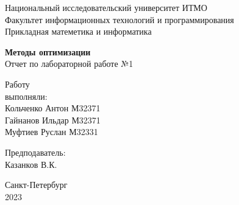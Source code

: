 \thispagestyle{empty}

\begin{center}

    Национальный исследовательский университет ИТМО\\
    Факультет информационных технологий и программирования\\
    Прикладная матеметика и информатика\\

    \vspace{20pt}

\end{center}

\vfill

\begin{center}
    \textbf {
    Методы оптимизации 
    } \\  
    Отчет по лабораторной работе №1
    
\end{center}

\vfill

\begin{flushright}

    \hfill {
    Работу \\
    выполняли: \\
    Кольченко Антон М32371 \\ 
    Гайнанов Ильдар М32371 \\ 
    Муфтиев Руслан М32331\\ 
    }
    \vspace{20pt}

    \hfill {
    Предподаватель: \\
    Казанков В.К.
    }

\end{flushright}

\vfill

\begin{center}
    Санкт-Петербург\\
    2023
\end{center}